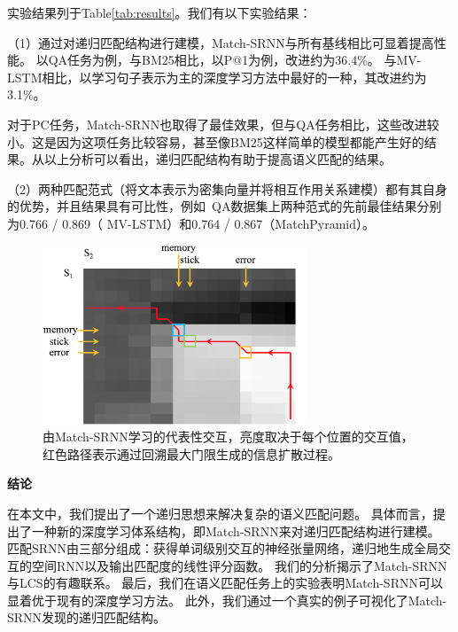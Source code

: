 实验结果列于Table\ref{tab:results}。我们有以下实验结果：

（1）通过对递归匹配结构进行建模，Match-SRNN与所有基线相比可显着提高性能。
以QA任务为例，与BM25相比，以P$@$1为例，改进约为36.4\%。
与MV-LSTM相比，以学习句子表示为主的深度学习方法中最好的一种，其改进约为3.1\%。

对于PC任务，Match-SRNN也取得了最佳效果，但与QA任务相比，这些改进较小。这是因为这项任务比较容易，甚至像BM25这样简单的模型都能产生好的结果。从以上分析可以看出，递归匹配结构有助于提高语义匹配的结果。

（2）两种匹配范式（将文本表示为密集向量并将相互作用关系建模）都有其自身的优势，并且结果具有可比性，例如~QA数据集上两种范式的先前最佳结果分别为0.766 / 0.869（ MV-LSTM）和0.764 / 0.867（MatchPyramid）。

\begin{figure}[t]
\includegraphics[width=0.7\textwidth]{figures/qa_path.png}
\caption{由Match-SRNN学习的代表性交互，亮度取决于每个位置的交互值，红色路径表示通过回溯最大门限生成的信息扩散过程。}
\label{fig:tensor}
\end{figure}

\textbf{结论}

在本文中，我们提出了一个递归思想来解决复杂的语义匹配问题。
具体而言，提出了一种新的深度学习体系结构，即Match-SRNN来对递归匹配结构进行建模。 匹配SRNN由三部分组成：获得单词级别交互的神经张量网络，递归地生成全局交互的空间RNN以及输出匹配度的线性评分函数。 我们的分析揭示了Match-SRNN与LCS的有趣联系。 最后，我们在语义匹配任务上的实验表明Match-SRNN可以显着优于现有的深度学习方法。 此外，我们通过一个真实的例子可视化了Match-SRNN发现的递归匹配结构。




